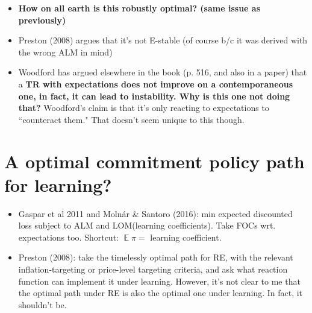 \documentclass[11pt]{article}
\renewcommand{\[}{\begin{equation}}
\renewcommand{\]}{\end{equation}}
\DeclareMathOperator{\E}{\mathbb{E}}
\begin{document}
\begin{enumerate}
\begin{itemize}
\begin{itemize}
\item \textbf{How on all earth is this robustly optimal? (same issue as previously)}
\item Preston (2008) argues that it's not E-stable (of course b/c it was derived with the wrong ALM in mind) 
\item Woodford has argued elsewhere in the book (p. 516, and also in a paper) that a \textbf{TR with expectations does not improve on a contemporaneous one, in fact, it can lead to instability. Why is this one not doing that?} Woodford's claim is that it's only reacting to expectations to ``counteract them." That doesn't seem unique to this though.
\end{itemize}
\end{itemize}
\end{enumerate}

\section{A optimal commitment policy path for learning?}
\begin{itemize}
\item Gaspar et al 2011 and Moln\'ar \& Santoro (2016): min expected discounted loss subject to ALM and LOM(learning coefficients). Take FOCs wrt. expectations too. Shortcut: $\E\pi =$ learning coefficient.
\item Preston (2008): take the timelessly optimal path for RE, with the relevant inflation-targeting or price-level targeting criteria, and ask what reaction function can implement it under learning. However, it's not clear to me that the optimal path under RE is also the optimal one under learning. In fact, it shouldn't be. 
\end{itemize}
\end{document}

